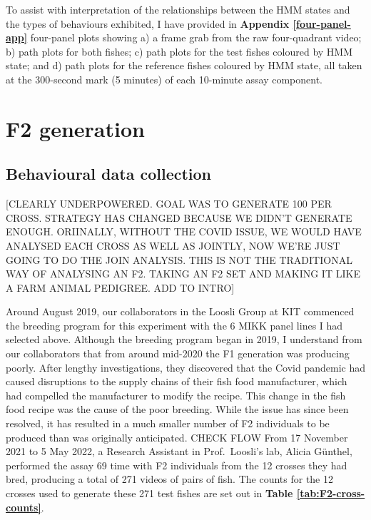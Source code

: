 \documentclass[
]{book}
\begin{document}
To assist with interpretation of the relationships between the HMM states and the types of behaviours exhibited, I have provided in \textbf{Appendix \ref{four-panel-app}} four-panel plots showing a) a frame grab from the raw four-quadrant video; b) path plots for both fishes; c) path plots for the test fishes coloured by HMM state; and d) path plots for the reference fishes coloured by HMM state, all taken at the 300-second mark (5 minutes) of each 10-minute assay component.

\hypertarget{f2-generation}{%
\section{F2 generation}\label{f2-generation}}

\hypertarget{behavioural-data-collection}{%
\subsection{Behavioural data collection}\label{behavioural-data-collection}}

{[}CLEARLY UNDERPOWERED. GOAL WAS TO GENERATE 100 PER CROSS. STRATEGY HAS CHANGED BECAUSE WE DIDN'T GENERATE ENOUGH. ORIINALLY, WITHOUT THE COVID ISSUE, WE WOULD HAVE ANALYSED EACH CROSS AS WELL AS JOINTLY, NOW WE'RE JUST GOING TO DO THE JOIN ANALYSIS. THIS IS NOT THE TRADITIONAL WAY OF ANALYSING AN F2. TAKING AN F2 SET AND MAKING IT LIKE A FARM ANIMAL PEDIGREE. ADD TO INTRO{]}

Around August 2019, our collaborators in the Loosli Group at KIT commenced the breeding program for this experiment with the 6 MIKK panel lines I had selected above. Although the breeding program began in 2019, I understand from our collaborators that from around mid-2020 the F1 generation was producing poorly. After lengthy investigations, they discovered that the Covid pandemic had caused disruptions to the supply chains of their fish food manufacturer, which had compelled the manufacturer to modify the recipe. This change in the fish food recipe was the cause of the poor breeding. While the issue has since been resolved, it has resulted in a much smaller number of F2 individuals to be produced than was originally anticipated. CHECK FLOW From 17 November 2021 to 5 May 2022, a Research Assistant in Prof.~Loosli's lab, Alicia Günthel, performed the assay 69 time with F2 individuals from the 12 crosses they had bred, producing a total of 271 videos of pairs of fish. The counts for the 12 crosses used to generate these 271 test fishes are set out in \textbf{Table \ref{tab:F2-cross-counts}}.
\end{document}
